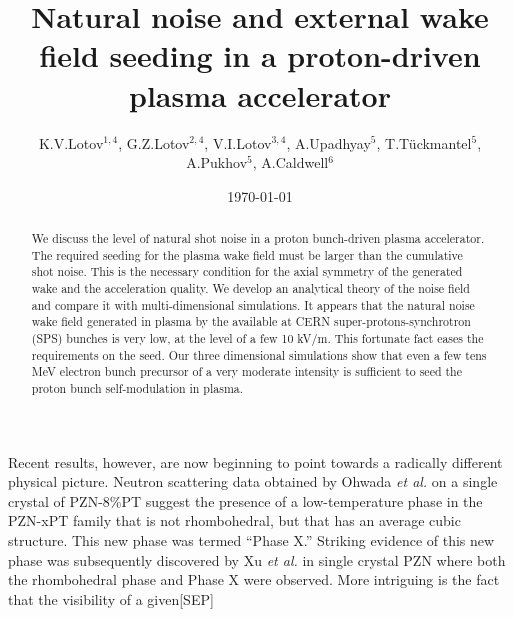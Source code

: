 Recent results, however, are now beginning to point towards a radically different physical picture. Neutron scattering data obtained by Ohwada {\it et al.} on a single crystal of PZN-8\%PT suggest the presence of a low-temperature phase in the PZN-xPT family that is not rhombohedral, but that has an average cubic structure. \cite{11} This new phase was termed ``Phase X.'' Striking evidence of this new phase was subsequently discovered by Xu {\it et al.} in single crystal PZN where both the rhombohedral phase and Phase X were observed. \cite{12} More intriguing is the fact that the visibility of a given[SEP]
\importpackages{}
\graphicspath{ {./images/} }


\title{Natural noise and external wake field seeding in a proton-driven plasma accelerator}
\author{K.V.Lotov$^{1,4}$, G.Z.Lotov$^{2,4}$, V.I.Lotov$^{3,4}$, A.Upadhyay$^5$, T.T\"uckmantel$^5$, A.Pukhov$^5$, A.Caldwell$^6$}
\date{\today}
\begin{abstract}
We discuss the level of natural shot noise in a proton bunch-driven plasma accelerator. The required seeding for the plasma wake field must be larger than the cumulative shot noise. This is the necessary condition for the axial symmetry of the generated wake and the acceleration quality. We develop an analytical theory of the noise field and compare it with multi-dimensional simulations. It appears that the natural noise wake field generated in plasma by the available at CERN super-protons-synchrotron (SPS) bunches is very low, at the level of a few 10 kV/m. This fortunate fact 
eases the requirements on the seed. Our three dimensional simulations show that even a few tens MeV electron bunch precursor of a very moderate intensity is sufficient to seed the proton bunch self-modulation in plasma.
\end{abstract}
\maketitle
